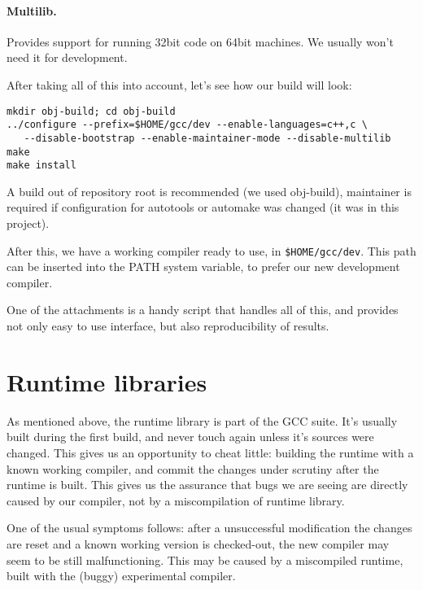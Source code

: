 \paragraph{Multilib.} Provides support for running 32bit code on 64bit
machines. We usually won't need it for development.

After taking all of this into account, let's see how our build will look:

\begin{verbatim}
mkdir obj-build; cd obj-build
../configure --prefix=$HOME/gcc/dev --enable-languages=c++,c \
   --disable-bootstrap --enable-maintainer-mode --disable-multilib
make
make install
\end{verbatim}

A build out of repository root is recommended (we used obj-build), maintainer
is required if configuration for autotools or automake was changed (it was in
this project).

After this, we have a working compiler ready to use, in {\tt \$HOME/gcc/dev}.
This path can be inserted into the PATH system variable, to prefer our new
development compiler.

One of the attachments is a handy script that handles all of this, and provides
not only easy to use interface, but also reproducibility of results.

\section{Runtime libraries}

As mentioned above, the runtime library is part of the GCC suite. It's usually
built during the first build, and never touch again unless it's sources were
changed. This gives us an opportunity to cheat little: building the runtime
with a known working compiler, and commit the changes under scrutiny after the
runtime is built. This gives us the assurance that bugs we are seeing are
directly caused by our compiler, not by a miscompilation of runtime library.

One of the usual symptoms follows: after a unsuccessful modification the
changes are reset and a known working version is checked-out, the new compiler
may seem to be still malfunctioning. This may be caused by a miscompiled
runtime, built with the (buggy) experimental compiler.
